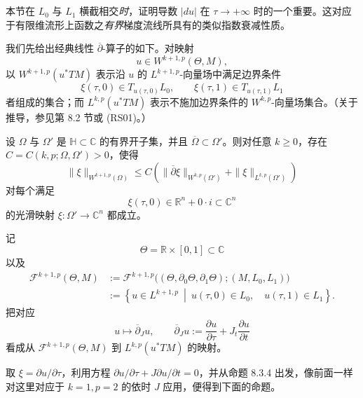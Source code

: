 \section{\termExponentialDecay{}}
\label{sec:exponential-decay}

本节在 $L_0$ 与 $L_1$ 横截相交\emph{时}，证明导数 $|du|$ 在
$\tau\to+\infty$ 时的一个重要\termExponentialDecayEstimate{}。这对应于有限维流形上\personMorse{}函数之\emph{有界}梯度流线所具有的类似指数衰减性质。

我们先给出经典线性 $\overline\partial$-算子的如下\termAprioriEstimate{}。对映射
\[
  u\in W^{k+1,p}(\Theta,M),
\]
以 $W^{k+1,p}(u^*TM)$ 表示沿 $u$ 的 $L^{k+1,p}$-向量场中满足边界条件
\[
  \xi(\tau,0)\in T_{u(\tau,0)}L_0,
  \qquad
  \xi(\tau,1)\in T_{u(\tau,1)}L_1
\]
者组成的集合；而 $L^{k,p}(u^*TM)$ 表示不施加边界条件的
$W^{k,p}$-向量场集合。（关于推导，参见第 8.2 节或 (RS01)。）

\begin{lemma}
\label{lem:linear-dbar-boundary-estimate}
设 $\Omega$ 与 $\Omega'$ 是\termUpperHalfSpace{}
$\mathbb H\subset\mathbb C$ 的有界开子集，并且
$\overline\Omega\subset\Omega'$。则对任意 $k\geq0$，存在
$C=C(k,p;\Omega,\Omega')>0$，使得
\begin{equation}
  \|\xi\|_{W^{k+1,p}(\Omega)}
  \leq
  C\left(
    \|\overline\partial\xi\|_{W^{k,p}(\Omega')}
    +\|\xi\|_{L^{k,p}(\Omega')}
  \right)
\label{eq:linear-dbar-boundary-estimate}
\end{equation}
对每个满足
\[
  \xi(\tau,0)\in\mathbb R^n+0\cdot i\subset\mathbb C^n
\]
的光滑映射 $\xi:\Omega'\to\mathbb C^n$ 都成立。
\end{lemma}

记
\[
  \Theta=\mathbb R\times[0,1]\subset\mathbb C
\]
以及
\[
  \begin{aligned}
  \mathcal F^{k+1,p}(\Theta,M)
  &:={\mathcal F}^{k+1,p}
    \bigl((\Theta,\partial_0\Theta,\partial_1\Theta);(M,L_0,L_1)\bigr)\\
  &:=\left\{
      u\in L^{k+1,p}
      \ \middle|\
      u(\tau,0)\in L_0,\quad u(\tau,1)\in L_1
    \right\}.
  \end{aligned}
\]
把对应
\[
  u\longmapsto\overline\partial_Ju,
  \qquad
  \overline\partial_Ju
  :=\frac{\partial u}{\partial\tau}
    +J_t\frac{\partial u}{\partial t}
\]
看成从 $\mathcal F^{k+1,p}(\Theta,M)$ 到 $L^{k,p}(u^*TM)$ 的映射。

取 $\xi=\partial u/\partial\tau$，利用方程
$\partial u/\partial\tau+J\partial u/\partial t=0$，并从命题 8.3.4
出发，像前面一样对这里对应于 $k=1,p=2$ 的依时 $J$ 应用\termInterpolationTheorem{}，便得到下面的命题。

